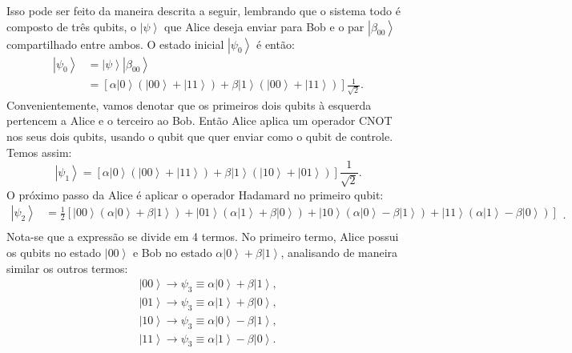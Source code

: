Isso pode ser feito da maneira descrita  a seguir, lembrando que o sistema todo é composto de três qubits, o $\left|\psi\right\rangle $ que Alice deseja enviar para Bob e o par $\left|\beta_{00}\right\rangle $ compartilhado entre ambos. O estado inicial $\left|\psi_{0}\right\rangle $ é então:
\begin{equation}
\begin{split}
\left|\psi_{0}\right\rangle & =\left|\psi\right\rangle \left|\beta_{00}\right\rangle \\
& =\left[\alpha\left|0\right\rangle \left(\left|00\right\rangle +\left|11\right\rangle \right)+\beta\left|1\right\rangle \left(\left|00\right\rangle +\left|11\right\rangle \right)\right]\frac{1}{\sqrt{2}}.
\end{split}
 \end{equation}
Convenientemente, vamos  denotar que os primeiros dois qubits à esquerda pertencem a Alice e o terceiro ao Bob. Então Alice aplica um operador CNOT nos seus dois qubits, usando o qubit que quer enviar como o qubit de controle. Temos assim:
\begin{equation}
\left|\psi_{1}\right\rangle =\left[\alpha\left|0\right\rangle \left(\left|00\right\rangle +\left|11\right\rangle \right)+\beta\left|1\right\rangle \left(\left|10\right\rangle +\left|01\right\rangle \right)\right]\frac{1}{\sqrt{2}}
. \end{equation}
O próximo passo da Alice é aplicar o operador Hadamard no primeiro qubit:
\begin{equation}
\begin{split}
\left|\psi_{2}\right\rangle & =\frac{1}{2}\left[\left|00\right\rangle \left(\alpha\left|0\right\rangle +\beta\left|1\right\rangle \right)+\left|01\right\rangle \left(\alpha\left|1\right\rangle +\beta\left|0\right\rangle \right)+\left|10\right\rangle \left(\alpha\left|0\right\rangle -\beta\left|1\right\rangle \right)+\left|11\right\rangle \left(\alpha\left|1\right\rangle -\beta\left|0\right\rangle \right)\right] \\
\end{split}
\label{psi2A}
. \end{equation}
Nota-se que a expressão se divide em 4 termos. No primeiro termo, Alice possui os qubits no estado $\left|00\right\rangle $ e Bob no estado $\alpha\left|0\right\rangle +\beta\left|1\right\rangle $, analisando de maneira similar os outros termos:
\begin{equation}
\begin{split}
\left|00\right\rangle \rightarrow\psi_{3}\equiv\alpha\left|0\right\rangle +\beta\left|1\right\rangle , \\
\left|01\right\rangle \rightarrow\psi_{3} \equiv\alpha\left|1\right\rangle +\beta\left|0\right\rangle , \\
\left|10\right\rangle \rightarrow\psi_{3}  \equiv\alpha\left|0\right\rangle -\beta\left|1\right\rangle, \\
\left|11\right\rangle \rightarrow\psi_{3} \equiv\alpha\left|1\right\rangle -\beta\left|0\right\rangle .
\end{split}
\end{equation}
